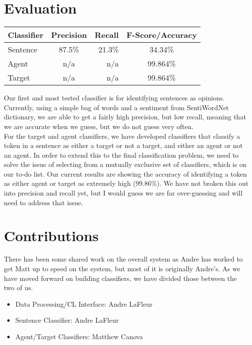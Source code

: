 \documentclass{article}
\begin{document}
    \section{Evaluation}
    
    \begin{center}
  \begin{tabular}{ | l | c | r | c}
    \hline
    Classifier & Precision & Recall & F-Score/Accuracy \\ \hline
    Sentence & 87.5\% & 21.3\% & 34.34\%\\ \hline
    Agent & n/a & n/a & 99.864\%\\ \hline
    Target & n/a & n/a & 99.864\%\\
    \hline
  \end{tabular}
\end{center}

    Our first and most tested classifier is for identifying sentences as opinions. Currently, using a simple bag of words and a sentiment from SentiWordNet dictionary, we are able to get a fairly high precision, but low recall, meaning that we are accurate when we guess, but we do not guess very often. \\ 
    
    For the target and agent classifiers, we have developed classifiers that classify a token in a sentence as either a target or not a target, and either an agent or not an agent. In order to extend this to the final classification problem, we need to solve the issue of selecting from a mutually exclusive set of classifiers, which is on our to-do list. Our current results are showing the accuracy of identifying a token as either agent or target as extremely high (99.86\%). We have not broken this out into precision and recall yet, but I would guess we are far over-guessing and will need to address that issue. 
    
    \section{Contributions}
    There has been some shared work on the overall system as Andre has worked to get Matt up to speed on the system, but most of it is originally Andre's. As we have moved forward on building classifiers, we have divided those between the two of us. 
    \begin{itemize}
    \item Data Processing/CL Interface: Andre LaFleur \\
    \item Sentence Classifier: Andre LaFleur \\
    \item Agent/Target Classifiers: Matthew Canova \\
    \end{itemize}
\end{document}

